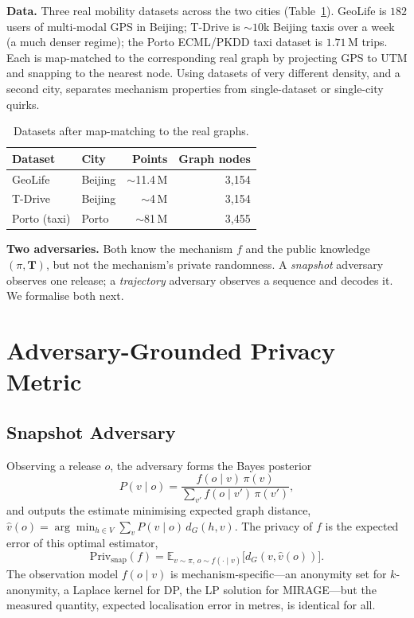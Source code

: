 \documentclass[11pt]{article}
\newcommand{\dG}{d_{G}}
\begin{document}
\textbf{Data.} Three real mobility datasets across the two cities
(Table~\ref{tab:data}). GeoLife \cite{zheng2009,zheng2008} is $182$ users of
multi-modal GPS in Beijing; T-Drive is $\sim$$10$k Beijing taxis over a week (a
much denser regime); the Porto ECML/PKDD taxi dataset is $1.71$\,M trips. Each is
map-matched to the corresponding real graph by projecting GPS to UTM and snapping
to the nearest node. Using datasets of very different density, and a second city,
separates mechanism properties from single-dataset or single-city quirks.

\begin{table}[t]\centering
\caption{Datasets after map-matching to the real graphs.}
\label{tab:data}
\begin{tabular}{llrr}
\toprule
Dataset & City & Points & Graph nodes \\
\midrule
GeoLife & Beijing & $\sim$11.4\,M & 3{,}154 \\
T-Drive & Beijing & $\sim$4\,M & 3{,}154 \\
Porto (taxi) & Porto & $\sim$81\,M & 3{,}455 \\
\bottomrule
\end{tabular}
\end{table}

\textbf{Two adversaries.} Both know the mechanism $f$ and the public knowledge
$(\pi,\mathbf{T})$, but not the mechanism's private randomness. A \emph{snapshot}
adversary observes one release; a \emph{trajectory} adversary observes a sequence
and decodes it. We formalise both next.

\section{Adversary-Grounded Privacy Metric}
\label{sec:adversary}
\subsection{Snapshot Adversary}
Observing a release $o$, the adversary forms the Bayes posterior
\begin{equation}
P(v\mid o)=\frac{f(o\mid v)\,\pi(v)}{\sum_{v'} f(o\mid v')\,\pi(v')},
\end{equation}
and outputs the estimate minimising expected graph distance,
$\hat v(o)=\arg\min_{h\in V}\sum_v P(v\mid o)\,\dG(h,v)$. The privacy of $f$ is the
expected error of this optimal estimator,
\begin{equation}
\mathrm{Priv}_{\mathrm{snap}}(f)=\mathbb{E}_{v\sim\pi,\,o\sim f(\cdot\mid v)}\big[\dG(v,\hat v(o))\big].
\label{eq:snapprivacy}
\end{equation}
The observation model $f(o\mid v)$ is mechanism-specific---an anonymity set for
$k$-anonymity, a Laplace kernel for DP, the LP solution for MIRAGE---but the
measured quantity, expected localisation error in metres, is identical for all.
\end{document}
